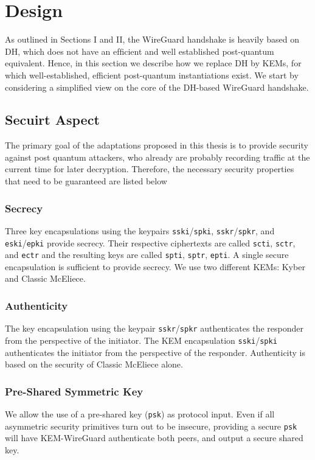 \chapter{Design}
\label{chap:Design}

As outlined in Sections I and II, the WireGuard handshake is heavily based on DH, which does not have an efﬁcient and well established post-quantum equivalent. Hence, in this section we describe how we replace DH by KEMs, for which well-established, efficient post-quantum instantiations exist.
We start by considering a simpliﬁed view on the core of the DH-based WireGuard handshake.


\section{Secuirt Aspect}
\label{sec:ProblemFormulation}
The primary goal of the adaptations proposed in this thesis is to provide security against post quantum attackers, who already are probably recording traffic at the current time for later decryption. Therefore, the necessary security properties that need to be guaranteed are listed below

\subsection{Secrecy}
Three key encapsulations using the keypairs \texttt{sski}/\texttt{spki},
\texttt{sskr}/\texttt{spkr}, and \texttt{eski}/\texttt{epki} provide
secrecy. Their respective ciphertexts are called \texttt{scti},
\texttt{sctr}, and \texttt{ectr} and the resulting keys are called
\texttt{spti}, \texttt{sptr}, \texttt{epti}. A single secure
encapsulation is sufficient to provide secrecy. We use two different
KEMs: Kyber and Classic McEliece.

\subsection{Authenticity}
The key encapsulation using the keypair \texttt{sskr}/\texttt{spkr}
authenticates the responder from the perspective of the initiator. The KEM encapsulation \texttt{sski}/\texttt{spki} authenticates the
initiator from the perspective of the responder. Authenticity is based
on the security of Classic McEliece alone.
\subsection{Pre-Shared Symmetric Key}
We allow the use of a pre-shared key (\texttt{psk}) as protocol input.
Even if all asymmetric security primitives turn out to be insecure,
providing a secure \texttt{psk} will have KEM-WireGuard authenticate both
peers, and output a secure shared key.
